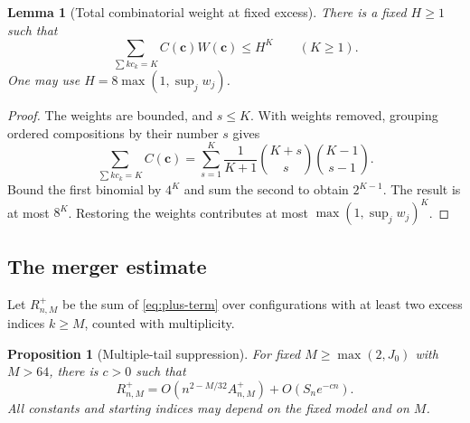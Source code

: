 \documentclass[11pt,a4paper]{article}
\numberwithin{equation}{section}
\newtheorem{proposition}[theorem]{Proposition}
\newtheorem{lemma}[theorem]{Lemma}
\theoremstyle{definition}
\theoremstyle{remark}
\begin{document}
\begin{lemma}[Total combinatorial weight at fixed excess]
\label{lem:weightbound}
There is a fixed $H\ge1$ such that
\begin{equation}
 \sum_{\sum k c_k=K}C(\mathbf c)W(\mathbf c)\le H^K
 \qquad(K\ge1).
 \label{eq:weightbound}
\end{equation}
One may use $H=8\max(1,\sup_j w_j)$.
\end{lemma}

\begin{proof}
The weights are bounded, and $s\le K$. With weights removed, grouping
ordered compositions by their number $s$ gives
\[
 \sum_{\sum k c_k=K}C(\mathbf c)
 =\sum_{s=1}^K\frac1{K+1}\binom{K+s}{s}\binom{K-1}{s-1}.
\]
Bound the first binomial by $4^K$ and sum the second to obtain
$2^{K-1}$. The result is at most $8^K$. Restoring the weights contributes
at most $\max(1,\sup_jw_j)^K$.
\end{proof}

\subsection{The merger estimate}

Let $R_{n,M}^+$ be the sum of \eqref{eq:plus-term} over configurations
with at least two excess indices $k\ge M$, counted with multiplicity.

\begin{proposition}[Multiple-tail suppression]
\label{prop:multitail}
For fixed $M\ge\max(2,J_0)$ with $M>64$, there is $c>0$ such that
\begin{equation}
 R_{n,M}^+
 =O\!\left(n^{2-M/32} A_{n,M}^+\right)+O(S_ne^{-cn}).
 \label{eq:multitail}
\end{equation}
All constants and starting indices may depend on the fixed model and on $M$.
\end{proposition}
\end{document}
